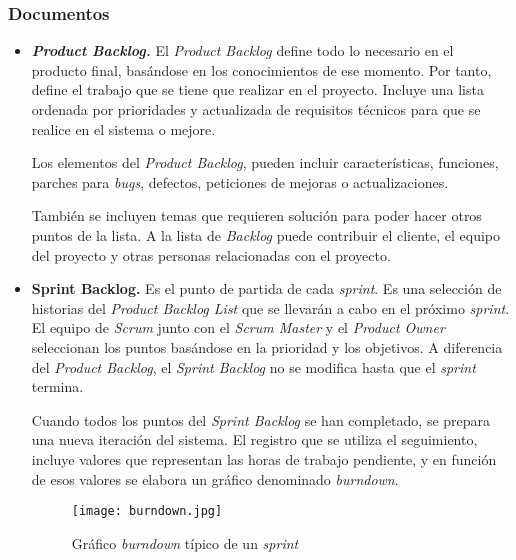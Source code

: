 \subsubsection{Documentos}
\begin{itemize}
\item \textbf{\textit{Product Backlog.}} El \textit{Product Backlog} define todo lo necesario en el producto final, basándose en los conocimientos de ese momento. Por tanto, define el trabajo que se tiene que realizar en el proyecto. Incluye una lista ordenada por prioridades y actualizada de requisitos técnicos para que se realice en  el sistema o mejore. 

Los elementos del \textit{Product Backlog}, pueden incluir características, funciones, parches para \textit{bugs}, defectos, peticiones de mejoras o actualizaciones.
 
También se incluyen temas que requieren solución para poder hacer otros puntos de la lista. A la lista de \textit{Backlog} puede contribuir el cliente, el equipo del proyecto y otras personas relacionadas con el proyecto.

\item \textbf{Sprint Backlog.} Es el punto de partida de cada \textit{sprint}. Es una selección de historias del \textit{Product Backlog List} que se llevarán a cabo en el próximo \textit{sprint}. El equipo de \textit{Scrum} junto con el \textit{Scrum Master} y el \textit{Product Owner} seleccionan los puntos basándose en la prioridad y los objetivos. A diferencia del \textit{Product Backlog}, el \textit{Sprint Backlog} no se modifica hasta que el \textit{sprint} termina.
 
Cuando todos los puntos del \textit{Sprint Backlog} se han completado, se prepara una nueva iteración del sistema. El registro que se utiliza el seguimiento, incluye valores que representan las horas de trabajo pendiente, y en función de esos valores se elabora un gráfico denominado \textit{burndown}.

\begin{figure}[h] 
  \centering
  \texttt{[image: burndown.jpg]}
  \caption{Gráfico \textit{burndown} típico de un \textit{sprint}}
  \label{fig:burndown}
\end{figure}

\end{itemize}

